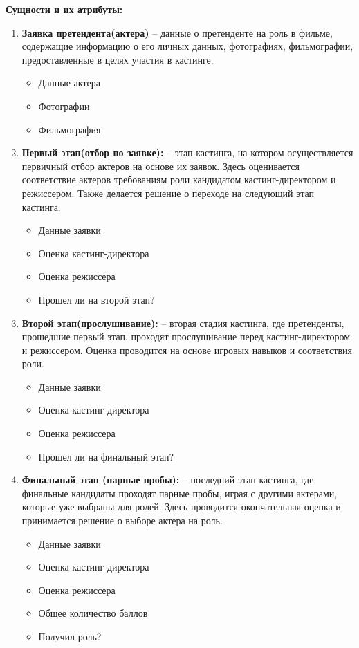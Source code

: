 \documentclass[11pt,a4paper,final]{article} %
\begin{document}
\par \textbf{Сущности и их атрибуты:}
\begin{enumerate}
		
\item \textbf{Заявка претендента(актера)} -- данные о претенденте на роль в фильме, содержащие информацию о его личных данных, фотографиях, фильмографии, предоставленные в целях участия в кастинге.
  \begin{itemize}
    \item Данные актера
  	\item Фотографии
  	\item Фильмография
  \end{itemize}

\item \textbf{Первый этап(отбор по заявке):} -- этап кастинга, на котором осуществляется первичный отбор актеров на основе их заявок. Здесь оценивается соответствие актеров требованиям роли кандидатом кастинг-директором и режиссером. Также делается решение о переходе на следующий этап кастинга.
\begin{itemize}
	\item Данные заявки
	\item Оценка кастинг-директора
	\item Оценка режиссера
	\item Прошел ли на второй этап? 
	
\end{itemize}

\item \textbf{Второй этап(прослушивание):} -- вторая стадия кастинга, где претенденты, прошедшие первый этап, проходят прослушивание перед кастинг-директором и режиссером. Оценка проводится на основе игровых навыков и соответствия роли.
\begin{itemize}
	\item Данные заявки
	\item Оценка кастинг-директора
	\item Оценка режиссера
	\item Прошел ли на финальный этап?
\end{itemize}

\item \textbf{Финальный этап (парные пробы):} -- последний этап кастинга, где финальные кандидаты проходят парные пробы, играя с другими актерами, которые уже выбраны для ролей. Здесь проводится окончательная оценка и принимается решение о выборе актера на роль.
\begin{itemize} 
	\item Данные заявки
	\item Оценка кастинг-директора
	\item Оценка режиссера
	\item Общее количество баллов 
	\item Получил роль? 
\end{itemize}



\end{enumerate}
\end{document}
